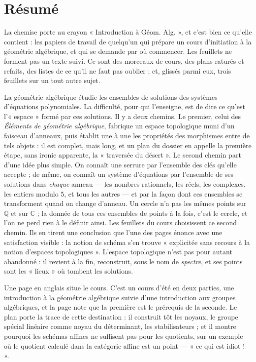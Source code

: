 \documentclass[11pt,a4paper]{article}
\begin{document}
\section*{Résumé}

\begin{resume}
La chemise porte au crayon « Introduction à Géom. Alg. », et c'est bien ce
qu'elle contient : les papiers de travail de quelqu'un qui prépare un cours
d'initiation à la géométrie algébrique, et qui se demande par où commencer.
Les feuillets ne forment pas un texte suivi. Ce sont des morceaux de cours,
des plans raturés et refaits, des listes de ce qu'il ne faut pas oublier ; et,
glissés parmi eux, trois feuillets sur un tout autre sujet.

La géométrie algébrique étudie les ensembles de solutions des systèmes
d'équations polynomiales. La difficulté, pour qui l'enseigne, est de dire ce
qu'est l'« espace » formé par ces solutions. Il y a deux chemins. Le premier,
celui des \emph{Éléments de géométrie algébrique}, fabrique un espace
topologique muni d'un faisceau d'anneaux, puis établit une à une les propriétés
des morphismes entre de tels objets : il est complet, mais long, et un plan du
dossier en appelle la première étape, sans ironie apparente, la « traversée du
désert ». Le second chemin part d'une idée plus simple. On connaît une serrure
par l'ensemble des clés qu'elle accepte ; de même, on connaît un système
d'équations par l'ensemble de ses solutions dans \emph{chaque} anneau --- les
nombres rationnels, les réels, les complexes, les entiers modulo $5$, et tous
les autres --- et par la façon dont ces ensembles se transforment quand on
change d'anneau. Un cercle n'a pas les mêmes points sur $\mathbb{Q}$ et sur
$\mathbb{C}$ ; la donnée de tous ces ensembles de points à la fois, c'est le
cercle, et l'on ne perd rien à le définir ainsi. Les feuillets du cours
choisissent ce second chemin. Ils en tirent une conclusion que l'une des pages
énonce avec une satisfaction visible : la notion de schéma s'en trouve
« explicitée sans recours à la notion d'espaces topologiques ». L'espace
topologique n'est pas pour autant abandonné : il revient à la fin, reconstruit,
sous le nom de \emph{spectre}, et ses points sont les « lieux » où tombent les
solutions.

Une page en anglais situe le cours. C'est un cours d'été en deux parties, une
introduction à la géométrie algébrique suivie d'une introduction aux groupes
algébriques, et la page note que la première est le prérequis de la seconde.
Le plan porte la trace de cette destination : il construit tôt les noyaux, le
groupe spécial linéaire comme noyau du déterminant, les stabilisateurs ; et il
montre pourquoi les schémas affines ne suffisent pas pour les quotients, sur un
exemple où le quotient calculé dans la catégorie affine est un point --- « ce
qui est idiot ! ».


\end{resume}
\end{document}
